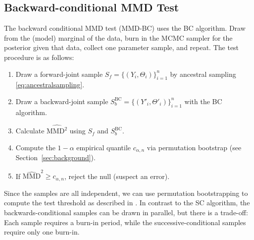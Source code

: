 \documentclass{article}
\newcommand{\tildepi}{\tilde{\pi}}
\begin{document}
\subsection{Backward-conditional MMD Test}
The backward conditional MMD test (MMD-BC) uses the BC algorithm.
Draw from the (model) marginal of the data, burn in the MCMC sampler for the posterior given that data, collect one parameter sample, and repeat.
The test procedure is as follows:
\begin{enumerate}
    \item Draw a forward-joint sample $S_f=\{(Y_i,\Theta_i)\}_{i=1}^n$ by ancestral sampling \eqref{eq:ancestralsampling}.
    \item Draw a backward-joint sample $S_{b}^{\mathrm{BC}}=\{(Y'_i, \Theta'_{i})\}_{i=1}^{n}$ with the BC algorithm.
    \item Calculate $\widehat{\mathrm{MMD}^2}$ using $S_f$ and $S_b^{\mathrm{BC}}$.
    \item Compute the $1-\alpha$ empirical quantile $c_{\alpha, n}$ via permutation bootstrap (see Section~\ref{sec:background}).  
    \item If $\widehat{\mathrm{MMD}}^{2} \geq c_{\alpha, n}$, reject the null (suspect an error). 
\end{enumerate}
Since the samples are all independent, we can use permutation bootstrapping to compute the test threshold as described in \cite{gretton_kernel_2012}. 
In contrast to the SC algorithm, the backwards-conditional samples can be drawn in parallel, but there is a trade-off: Each sample requires a burn-in period, while the successive-conditional samples require only one burn-in.

\end{document}
